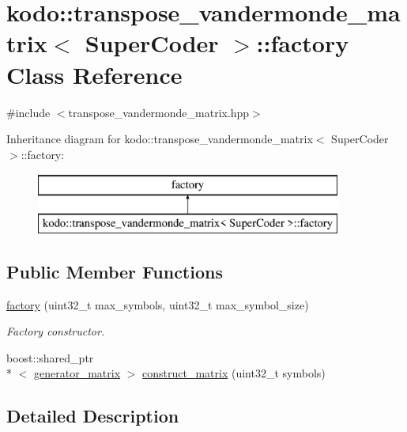 \hypertarget{classkodo_1_1transpose__vandermonde__matrix_1_1factory}{\section{kodo\-:\-:transpose\-\_\-vandermonde\-\_\-matrix$<$ Super\-Coder $>$\-:\-:factory Class Reference}
\label{classkodo_1_1transpose__vandermonde__matrix_1_1factory}
}


{\ttfamily \#include $<$transpose\-\_\-vandermonde\-\_\-matrix.\-hpp$>$}

Inheritance diagram for kodo\-:\-:transpose\-\_\-vandermonde\-\_\-matrix$<$ Super\-Coder $>$\-:\-:factory\-:\begin{figure}[H]
\begin{center}
\leavevmode
\includegraphics[height=2.000000cm]{classkodo_1_1transpose__vandermonde__matrix_1_1factory}
\end{center}
\end{figure}
\subsection*{Public Member Functions}
\begin{DoxyCompactItemize}
\item 
\hyperlink{classkodo_1_1transpose__vandermonde__matrix_1_1factory_a6bd881b0e179bdc5f0286e9381b0d061}{factory} (uint32\-\_\-t max\-\_\-symbols, uint32\-\_\-t max\-\_\-symbol\-\_\-size)
\begin{DoxyCompactList}\small\item\em Factory constructor. \end{DoxyCompactList}\item 
boost\-::shared\-\_\-ptr\\*
$<$ \hyperlink{classkodo_1_1transpose__vandermonde__matrix_aa009fc588662c9cf5495dad11cfbabab}{generator\-\_\-matrix} $>$ \hyperlink{classkodo_1_1transpose__vandermonde__matrix_1_1factory_aec74e9769f94247a796baa4624e4b6f4}{construct\-\_\-matrix} (uint32\-\_\-t symbols)
\end{DoxyCompactItemize}


\subsection{Detailed Description}
